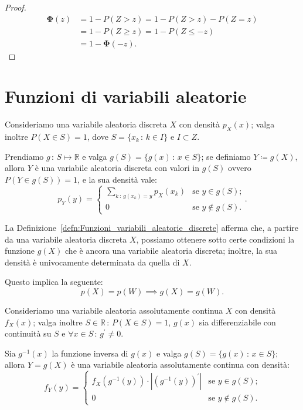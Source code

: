             \begin{proof}
                \hfill
                \begin{align*}
                    \mathbf{\Phi}(z) &= 1 - P(Z > z) = 1 - P(Z > z) - P(Z = z) \\
                                     &= 1 - P(Z \geq z) = 1 - P(Z \leq -z) \\
                                     &= 1 - \mathbf{\Phi}(-z)
                .\end{align*}
            \end{proof}
    \section{Funzioni di variabili aleatorie}
        \begin{defn}[discreta]\label{defn:Funzioni_variabili_aleatorie_discrete}
            Consideriamo una variabile aleatoria discreta $X$ con densità $p_X(x)$; valga inoltre $P(X \in S) = 1$, dove $S = \{x_k \,:\, k \in I\}$ e $I \subset Z$.

            Prendiamo $g\,:\, S \mapsto \mathbb{R}$ e valga $g(S) = \{g(x) \,:\, x \in S\}$; se definiamo $Y \coloneqq g(X)$, allora $Y$ è una variabile aleatoria discreta con valori in $g(S)$ ovvero $P(Y \in g(S)) = 1$, e la sua densità vale: \[
                p_Y(y) = \begin{cases}
                    \sum_{k \,:\, g(x_k) =y} p_X(x_k) & \text{se $y \in g(S)$;} \\
                    0 & \text{se $y \notin g(S)$.}
                \end{cases}
            .\]
        \end{defn}
        \begin{obsv}
            La Definizione~\ref{defn:Funzioni_variabili_aleatorie_discrete} afferma che, a partire da una variabile aleatoria discreta $X$, possiamo ottenere sotto certe condizioni la funzione $g(X)$ che è ancora una variabile aleatoria discreta; inoltre, la sua densità è univocamente determinata da quella di $X$.

            Questo implica la seguente: \[
                p(X) = p(W) \implies g(X) = g(W)
            .\] 
        \end{obsv}
        \begin{defn}[continua]\label{defn:Funzioni_variabili_aleatorie_continue}
            Consideriamo una variabile aleatoria assolutamente continua $X$ con densità $f_X(x)$; valga inoltre $S \in \mathbb{R} \,:\, P(X \in S) = 1$, $g(x)$ sia differenziabile con continuità su $S$ e $\forall x \in S \,:\, g^{\prime} \neq 0$.
            
            Sia $g^{-1}(x)$ la funzione inversa di $g(x)$ e valga $g(S) = \{g(x) \,:\, x \in S\}$; allora $Y = g(X)$ è una variabile aleatoria assolutamente continua con densità: \[
                f_Y(y) = \begin{cases}
                    f_X(g^{-1}(y)) \cdot \left|(g^{-1}(y))^{\prime}\right| & \text{se $y \in g(S)$;} \\
                    0 & \text{se $y \notin g(S)$.}
                \end{cases}
            \]
        \end{defn}
